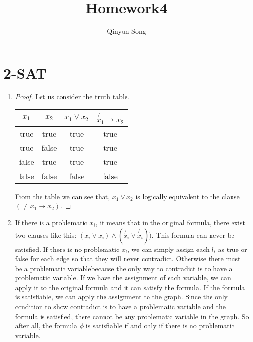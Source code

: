 \documentclass{article}
\title{Homework4}
\author{Qinyun Song}
\date{}
\begin{document}
	\maketitle

	\section{2-SAT}
		\begin{enumerate}
			\item \begin{proof}
				Let us consider the truth table.
				\begin{tabular}{|c|c|c|c|}
					\hline
					$x_1$ & $x_2$ & $x_1 \vee x_2$ & $\not{x_1} \to x_2$ \\
					\hline
					true & true & true & true \\
					\hline
					true & false & true & true \\
					\hline
					false & true & true & true \\
					\hline
					false & false & false & false \\
					\hline
				\end{tabular}
				From the table we can see that, $x_1 \vee x_2$ is logically equivalent to the clause $(\neq{x_1} \to x_2)$.
			\end{proof}
			\item If there is a problematic $x_i$, it means that in the original formula, there exist two clauses like this: $(x_i \vee x_i)\wedge(\not{x_i} \vee \not{x_i}))$. This formula can never be satisfied. If there is no problematic $x_i$, we can simply assign each $l_i$ as true or false for each edge so that they will never contradict. Otherwise there must be a problematic variablebecause the only way to contradict is to have a problematic variable. If we have the assignment of each variable, we can apply it to the original formula and it can satisfy the formula. \newline
			If the formula is satisfiable, we can apply the assignment to the graph. Since the only condition to show contradict is to have a problematic variable and the formula is satisfied, there cannot be any problematic variable in the graph. So after all, the formula $\phi$ is satisfiable if and only if there is no problematic variable.


\end{enumerate}
\end{document}
